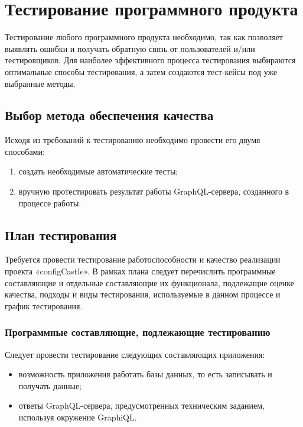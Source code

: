 \section{Тестирование программного продукта}

Тестирование любого программного продукта необходимо, так как позволяет выявлять ошибки и получать обратную связь от пользователей и/или тестировщиков.
Для наиболее эффективного процесса тестирования выбираются оптимальные способы тестирования, а затем создаются тест-кейсы под уже выбранные методы.

\subsection{Выбор метода обеспечения качества}

Исходя из требований к тестированию необходимо провести его двумя способами:

\begin{enumerate}
    \item создать необходимые автоматические тесты;
    \item вручную протестировать результат работы GraphQL-сервера, созданного в процессе работы.
\end{enumerate}

\subsection{План тестирования}

Требуется провести тестирование работоспособности и качество
реализации проекта «configCastle». В рамках плана следует перечислить
программные составляющие и отдельные составляющие их функционала,
подлежащие оценке качества, подходы и виды тестирования, используемые в
данном процессе и график тестирования.

\subsubsection{Программные составляющие, подлежающие тестированию}

Следует провести тестирование следующих составляющих приложения:

\begin{itemize}
    \item возможность приложения работать базы данных, то есть записывать и получать данные;
    \item ответы GraphQL-сервера, предусмотренных техническим заданием, используя окружение GraphiQL.
\end{itemize}

